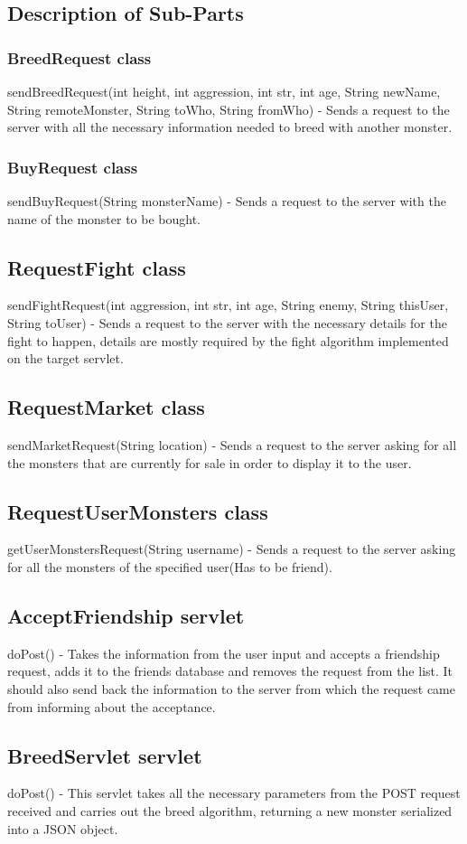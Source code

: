 \documentclass[titlepage]{article}
\begin{document}
{\subsection {Description of Sub-Parts}
\subsubsection {BreedRequest class}
sendBreedRequest(int height, int aggression,  int str, int age, String newName, String remoteMonster, String toWho, String fromWho) - Sends a request to the server with all the necessary information needed to breed with another monster.
\subsubsection{BuyRequest class}
sendBuyRequest(String monsterName) - Sends a request to the server with the name of the monster to be bought.
\subsection {RequestFight class}
sendFightRequest(int aggression, int str, int age, String enemy, String thisUser, String toUser) - Sends a request to the server with the necessary details for the fight to happen, details are mostly required by the fight algorithm implemented on the target servlet.
\subsection {RequestMarket class}
sendMarketRequest(String location) - Sends a request to the server asking for all the monsters that are currently for sale in order to display it to the user.
\subsection{RequestUserMonsters class}
getUserMonstersRequest(String username) - Sends a request to the server asking for all the monsters of the specified user(Has to be friend). 
\subsection {AcceptFriendship servlet}
doPost() - Takes the information from the user input and accepts a friendship request, adds it to the friends database and removes the request from the list. It should also send back the information to the server from which the request came from informing about the acceptance.
\subsection {BreedServlet servlet}
doPost() -  This servlet takes all the necessary parameters from the POST request received and carries out the breed algorithm, returning a new monster serialized into a JSON object.
}
\end{document}
